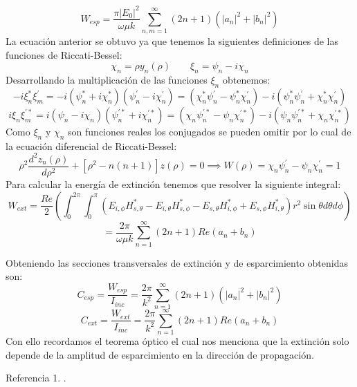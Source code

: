 \documentclass[letterpaper, 11pt]{article}
\begin{document}
\begin{equation}
     W_{esp}=\frac{\pi|E_0|^2}{\omega\mu k}\sum_{n,m=1}^\infty (2n+1) (|a_n|^2+|b_n|^2)
\end{equation}
La ecuación anterior se obtuvo ya que tenemos la siguientes definiciones de las funciones de Riccati-Bessel:
\begin{equation}
    \chi_n=\rho y_n (\rho) \qquad \xi_n=\psi_n - i\chi_n
\end{equation}
Desarrollando la multiplicación de las funciones $\xi_n$ obtenemos:
\begin{equation*}
    -i\xi_n^*\xi_m^{'}=-i(\psi_n^{*}+i\chi_n^{*})(\psi_n^{'}-i\chi_n^{'})=(\chi_n^*\psi_n^{'}-\psi_n^{*}\chi_n^{'})-i(\psi_n^*\psi_n^{'}+\chi_n^{*}\chi_n^{'})
\end{equation*}
\begin{equation*}
    i\xi_n\xi_m^{'*}=i(\psi_n-i\chi_n)(\psi_n^{'*}+i\chi_n^{'*})=(\chi_n\psi_n^{'*}-\psi_n\chi_n^{'*})-i(\psi_n\psi_n^{'*}+\chi_n\chi_n^{'*})
\end{equation*}
Como $\xi_n$ y $\chi_n$ son funciones reales los conjugados se pueden omitir por lo cual de la ecuación diferencial de Riccati-Bessel:
\begin{equation}
    \rho^2\frac{d^2z_n (\rho) }{d\rho^2}+[\rho^2-n(n+1)]z(\rho)=0 \implies W(\rho)=\chi_n\psi_n^{'}-\psi_n\chi_n^{'}=1
\end{equation}
Para calcular la energía de extinción tenemos que resolver la siguiente integral:
\begin{equation}
    W_{ext}=\frac{Re}{2}\left( \int_0^{2\pi} \int_0^{\pi} (E_{i,\phi}H_{s,\theta}^*-E_{i,\theta}H_{s,\phi}^*-E_{s,\theta}H_{i,\phi}^*+E_{s,\phi}H_{i,\theta}^*)r^2\sin\theta d\theta d\phi\right)
\end{equation}
\begin{equation*}
    =\frac{2\pi}{\omega \mu k}\sum_{n=1}^{\infty}(2n+1)Re(a_n+b_n)
\end{equation*}

Obteniendo las secciones transversales de extinción y de esparcimiento obtenidas son:
\begin{equation*}
    C_{esp}=\frac{W_{esp}}{I_{inc}}=\frac{2\pi}{k^2}\sum_{n=1}^{\infty}(2n+1)(|a_n|^2+|b_n|^2)
\end{equation*}
\begin{equation*}
    C_{ext}=\frac{W_{ext}}{I_{inc}}=\frac{2\pi}{k^2}\sum_{n=1}^{\infty}(2n+1)Re(a_n+b_n)
\end{equation*}
Con ello recordamos el teorema óptico el cual nos menciona que la extinción solo depende de la amplitud de esparcimiento en la dirección de propagación.





\begin{thebibliography}{99} %

 Referencia 1.
.

\end{thebibliography}
\end{document}
